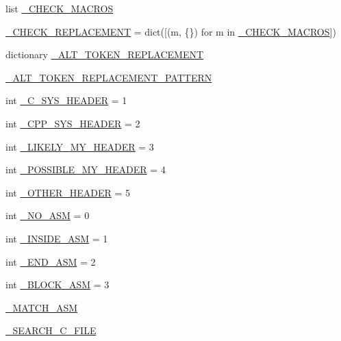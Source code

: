 \begin{DoxyCompactItemize}
list \hyperlink{namespacecpplint_a96865866cf9b608cbe21c0549782e33c}{\+\_\+\+C\+H\+E\+C\+K\+\_\+\+M\+A\+C\+R\+OS}
\item 
\hyperlink{namespacecpplint_aa29e61cc2dc32e1e9f61ecaed2907b48}{\+\_\+\+C\+H\+E\+C\+K\+\_\+\+R\+E\+P\+L\+A\+C\+E\+M\+E\+NT} = dict(\mbox{[}(m, \{\}) for m in \hyperlink{namespacecpplint_a96865866cf9b608cbe21c0549782e33c}{\+\_\+\+C\+H\+E\+C\+K\+\_\+\+M\+A\+C\+R\+OS}\mbox{]})
\item 
dictionary \hyperlink{namespacecpplint_a9f6ea78f990abb6ee767f35092008c75}{\+\_\+\+A\+L\+T\+\_\+\+T\+O\+K\+E\+N\+\_\+\+R\+E\+P\+L\+A\+C\+E\+M\+E\+NT}
\item 
\hyperlink{namespacecpplint_a06836e29f41961aead03ec8aadd1cecd}{\+\_\+\+A\+L\+T\+\_\+\+T\+O\+K\+E\+N\+\_\+\+R\+E\+P\+L\+A\+C\+E\+M\+E\+N\+T\+\_\+\+P\+A\+T\+T\+E\+RN}
\item 
int \hyperlink{namespacecpplint_a845e252934563f3b8dbab7cbbd81929d}{\+\_\+\+C\+\_\+\+S\+Y\+S\+\_\+\+H\+E\+A\+D\+ER} = 1
\item 
int \hyperlink{namespacecpplint_aa9513a195daca7c7835216243625060d}{\+\_\+\+C\+P\+P\+\_\+\+S\+Y\+S\+\_\+\+H\+E\+A\+D\+ER} = 2
\item 
int \hyperlink{namespacecpplint_a01c68489ef7fc81a65e23ed29a3cc77a}{\+\_\+\+L\+I\+K\+E\+L\+Y\+\_\+\+M\+Y\+\_\+\+H\+E\+A\+D\+ER} = 3
\item 
int \hyperlink{namespacecpplint_a7c70213e94a156b6c861f1e3d18bca48}{\+\_\+\+P\+O\+S\+S\+I\+B\+L\+E\+\_\+\+M\+Y\+\_\+\+H\+E\+A\+D\+ER} = 4
\item 
int \hyperlink{namespacecpplint_a5fad80255610fbd2b1e24d4705806378}{\+\_\+\+O\+T\+H\+E\+R\+\_\+\+H\+E\+A\+D\+ER} = 5
\item 
int \hyperlink{namespacecpplint_a03d7f3e1fb21e3da0a3c4ae1ca9f771a}{\+\_\+\+N\+O\+\_\+\+A\+SM} = 0
\item 
int \hyperlink{namespacecpplint_a5b040d60ab9e1d1e1971996561a620e2}{\+\_\+\+I\+N\+S\+I\+D\+E\+\_\+\+A\+SM} = 1
\item 
int \hyperlink{namespacecpplint_a6b53db7569ac305c328d95092cf45f1a}{\+\_\+\+E\+N\+D\+\_\+\+A\+SM} = 2
\item 
int \hyperlink{namespacecpplint_a0f1f8da647bf9ced22d7834e1d27d065}{\+\_\+\+B\+L\+O\+C\+K\+\_\+\+A\+SM} = 3
\item 
\hyperlink{namespacecpplint_a06e1a7cd329c1216de85c4524dbbb21c}{\+\_\+\+M\+A\+T\+C\+H\+\_\+\+A\+SM}
\item 
\hyperlink{namespacecpplint_a01ccd489908488cba7973b9a17caa343}{\+\_\+\+S\+E\+A\+R\+C\+H\+\_\+\+C\+\_\+\+F\+I\+LE}

\end{DoxyCompactItemize}
